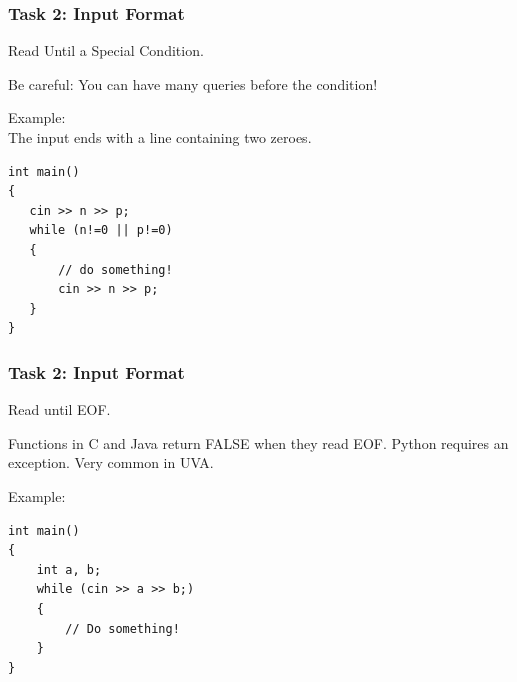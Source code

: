 \documentclass{beamer}
\begin{document}
\begin{frame}[fragile]
  \frametitle{Task 2: Input Format}
  \begin{block}{}
    Read Until a Special Condition.

    Be careful: You can have \alert{many} queries before the condition!
  \end{block}

  Example: \\
  The input ends with a line containing two zeroes.

{\smaller
\begin{verbatim}
int main()
{
   cin >> n >> p;
   while (n!=0 || p!=0)
   {
       // do something!
       cin >> n >> p;
   }
}
\end{verbatim}}
\end{frame}

\begin{frame}[fragile]
  \frametitle{Task 2: Input Format}
  \begin{block}{}
    Read until EOF.
    \bigskip

    Functions in C and Java return FALSE when they read EOF. Python requires
    an exception. Very common in UVA.
  \end{block}
  Example: 

{\smaller
\begin{verbatim}
int main()
{
    int a, b;
    while (cin >> a >> b;)
    {
        // Do something!
    }
}
\end{verbatim}
}
\end{frame}
\end{document}
